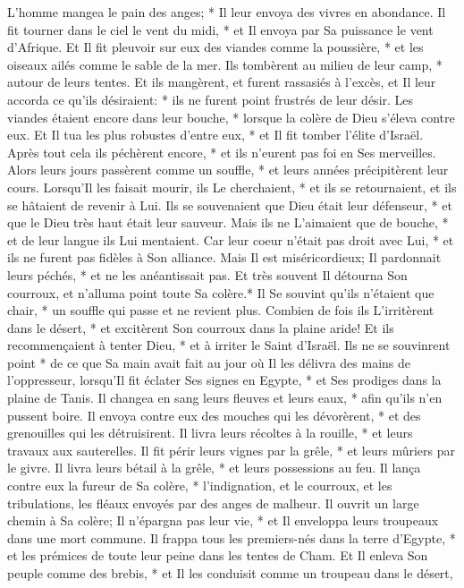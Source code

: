 L'homme mangea le pain des anges; * Il leur envoya des vivres en abondance.
Il fit tourner dans le ciel le vent du midi, * et Il envoya par Sa puissance le vent d'Afrique.
Et Il fit pleuvoir sur eux des viandes comme la poussière, * et les oiseaux ailés comme le sable de la mer.
Ils tombèrent au milieu de leur camp, * autour de leurs tentes.
Et ils mangèrent, et furent rassasiés à l'excès, et Il leur accorda ce qu'ils désiraient: *
ils ne furent point frustrés de leur désir. Les viandes étaient encore dans leur bouche, *
lorsque la colère de Dieu s'éleva contre eux. Et Il tua les plus robustes d'entre eux, * et Il fit tomber l'élite d'Israël.
Après tout cela ils péchèrent encore, * et ils n'eurent pas foi en Ses merveilles.
Alors leurs jours passèrent comme un souffle, * et leurs années précipitèrent leur cours.
Lorsqu'Il les faisait mourir, ils Le cherchaient, * et ils se retournaient, et ils se hâtaient de revenir à Lui.
Ils se souvenaient que Dieu était leur défenseur, * et que le Dieu très haut était leur sauveur.
Mais ils ne L'aimaient que de bouche, * et de leur langue ils Lui mentaient.
Car leur coeur n'était pas droit avec Lui, * et ils ne furent pas fidèles à Son alliance.
Mais Il est miséricordieux; Il pardonnait leurs péchés, * et ne les anéantissait pas. Et très souvent Il détourna Son courroux, et n'alluma point toute Sa colère.*
Il Se souvint qu'ils n'étaient que chair, * un souffle qui passe et ne revient plus.
Combien de fois ils L'irritèrent dans le désert, * et excitèrent Son courroux dans la plaine aride!
Et ils recommençaient à tenter Dieu, * et à irriter le Saint d'Israël.
Ils ne se souvinrent point * de ce que Sa main avait fait au jour où Il les délivra des mains de l'oppresseur,
lorsqu'Il fit éclater Ses signes en Egypte, * et Ses prodiges dans la plaine de Tanis.
Il changea en sang leurs fleuves et leurs eaux, * afin qu'ils n'en pussent boire.
Il envoya contre eux des mouches qui les dévorèrent, * et des grenouilles qui les détruisirent.
Il livra leurs récoltes à la rouille, * et leurs travaux aux sauterelles.
Il fit périr leurs vignes par la grêle, * et leurs mûriers par le givre.
Il livra leurs bétail à la grêle, * et leurs possessions au feu.
Il lança contre eux la fureur de Sa colère, * l'indignation, et le courroux, et les tribulations, les fléaux envoyés par des anges de malheur.
Il ouvrit un large chemin à Sa colère; Il n'épargna pas leur vie, * et Il enveloppa leurs troupeaux dans une mort commune.
Il frappa tous les premiers-nés dans la terre d'Egypte, * et les prémices de toute leur peine dans les tentes de Cham.
Et Il enleva Son peuple comme des brebis, * et Il les conduisit comme un troupeau dans le désert,
